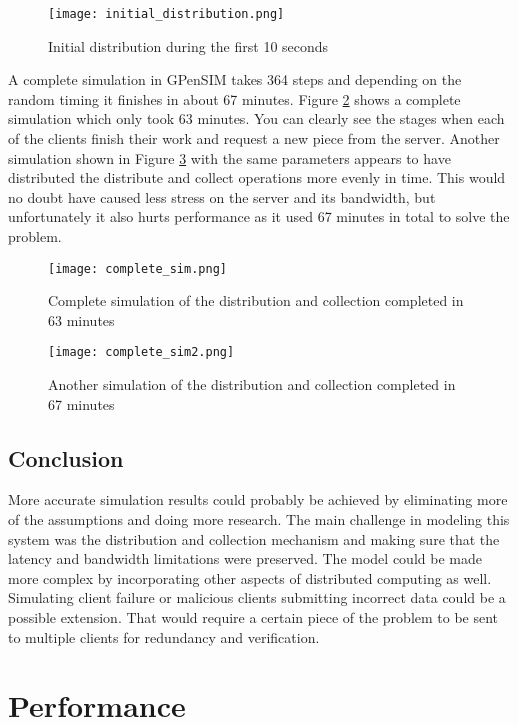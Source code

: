 \begin{figure}[htbp]
	\centering 
	\texttt{[image: initial\_distribution.png]}
	\caption{Initial distribution during the first 10 seconds}
	\label{fig:initdist}
\end{figure}

A complete simulation in GPenSIM takes 364 steps and depending on the random timing it finishes in about 67 minutes.
Figure \ref{fig:complete_sim} shows a complete simulation which only took 63 minutes.
You can clearly see the stages when each of the clients finish their work and request a new piece from the server.
Another simulation shown in Figure \ref{fig:complete_sim2} with the same parameters appears to have distributed the distribute and collect operations more evenly in time.
This would no doubt have caused less stress on the server and its bandwidth, but unfortunately it also hurts performance as it used 67 minutes in total to solve the problem.

\begin{figure}[htbp]
	\centering 
	\texttt{[image: complete\_sim.png]}
	\caption{Complete simulation of the distribution and collection completed in 63 minutes}
	\label{fig:complete_sim}
\end{figure}

\begin{figure}[htbp]
	\centering 
	\texttt{[image: complete\_sim2.png]}
	\caption{Another simulation of the distribution and collection completed in 67 minutes}
	\label{fig:complete_sim2}
\end{figure}


\subsection{Conclusion}

More accurate simulation results could probably be achieved by eliminating more of the assumptions and doing more research.
The main challenge in modeling this system was the distribution and collection mechanism and making sure that the latency and bandwidth limitations were preserved.
The model could be made more complex by incorporating other aspects of distributed computing as well.
Simulating client failure or malicious clients submitting incorrect data could be a possible extension.
That would require a certain piece of the problem to be sent to multiple clients for redundancy and verification.





\section{Performance}


